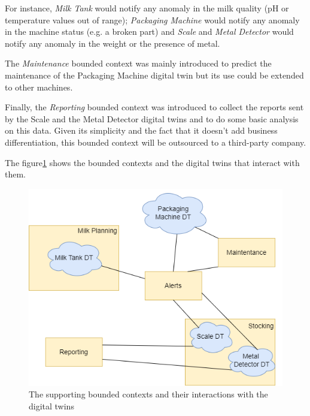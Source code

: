 For instance, \textit{Milk Tank} would notify any anomaly in the milk quality (pH or temperature values out of range);
\textit{Packaging Machine} would notify any anomaly in the machine status (e.g. a broken part) and \textit{Scale} and \textit{Metal Detector} would notify any anomaly in the weight or the presence of metal.

The \textit{Maintenance} bounded context was mainly introduced to predict the maintenance of the Packaging Machine digital twin but its use could be extended to other machines.

Finally, the \textit{Reporting} bounded context was introduced to collect the reports sent by the Scale and the Metal Detector digital twins and to do some basic analysis on this data.
Given its simplicity and the fact that it doesn't add business differentiation, this bounded context will be outsourced to a third-party company.

The figure\ref{img:subdomains-dt} shows the bounded contexts and the digital twins that interact with them.

\begin{figure}[H]
    \centering
    \includegraphics[width=\textwidth]{img/subdomains-dt.png}
    \caption{The supporting bounded contexts and their interactions with the digital twins}
    \label{img:subdomains-dt}
\end{figure}

